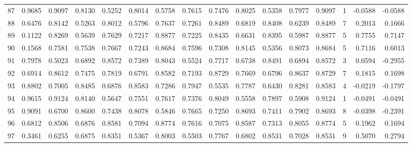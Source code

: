 \begin{tabular}{lrrrrrrrrrrrrrrr}
87  &      0.9685 &  0.9097 &  0.8130 &  0.5252 &  0.8014 &  0.5758 &  0.7615 &  0.7476 &  0.8025 &  0.5358 &   0.7977 &     0.9097 &      1 &                   -0.0588 &                    -0.0588 \\
88  &      0.6476 &  0.8142 &  0.5263 &  0.8012 &  0.5796 &  0.7637 &  0.7261 &  0.8489 &  0.6819 &  0.8408 &   0.6239 &     0.8489 &      7 &                    0.2013 &                     0.1666 \\
89  &      0.1122 &  0.8269 &  0.5639 &  0.7629 &  0.7217 &  0.8877 &  0.7225 &  0.8435 &  0.6631 &  0.8395 &   0.5987 &     0.8877 &      5 &                    0.7755 &                     0.7147 \\
90  &      0.1568 &  0.7581 &  0.7538 &  0.7667 &  0.7243 &  0.8684 &  0.7596 &  0.7308 &  0.8145 &  0.5356 &   0.8073 &     0.8684 &      5 &                    0.7116 &                     0.6013 \\
91  &      0.7978 &  0.5023 &  0.6892 &  0.8572 &  0.7389 &  0.8043 &  0.5524 &  0.7717 &  0.6738 &  0.8491 &   0.6894 &     0.8572 &      3 &                    0.0594 &                    -0.2955 \\
92  &      0.6914 &  0.8612 &  0.7475 &  0.7819 &  0.6791 &  0.8582 &  0.7193 &  0.8729 &  0.7669 &  0.6796 &   0.8637 &     0.8729 &      7 &                    0.1815 &                     0.1698 \\
93  &      0.8802 &  0.7005 &  0.8485 &  0.6876 &  0.8583 &  0.7286 &  0.7947 &  0.5535 &  0.7787 &  0.6430 &   0.8281 &     0.8583 &      4 &                   -0.0219 &                    -0.1797 \\
94  &      0.9615 &  0.9124 &  0.8140 &  0.5647 &  0.7551 &  0.7617 &  0.7376 &  0.8049 &  0.5558 &  0.7897 &   0.5908 &     0.9124 &      1 &                   -0.0491 &                    -0.0491 \\
95  &      0.9091 &  0.6700 &  0.8600 &  0.7438 &  0.8078 &  0.5846 &  0.7665 &  0.7250 &  0.8693 &  0.7411 &   0.7902 &     0.8693 &      8 &                   -0.0398 &                    -0.2391 \\
96  &      0.6812 &  0.8506 &  0.6876 &  0.8581 &  0.7094 &  0.8774 &  0.7616 &  0.7075 &  0.8587 &  0.7313 &   0.8055 &     0.8774 &      5 &                    0.1962 &                     0.1694 \\
97  &      0.3461 &  0.6255 &  0.6875 &  0.8351 &  0.5367 &  0.8003 &  0.5503 &  0.7767 &  0.6802 &  0.8531 &   0.7028 &     0.8531 &      9 &                    0.5070 &                     0.2794 \\

\end{tabular}
